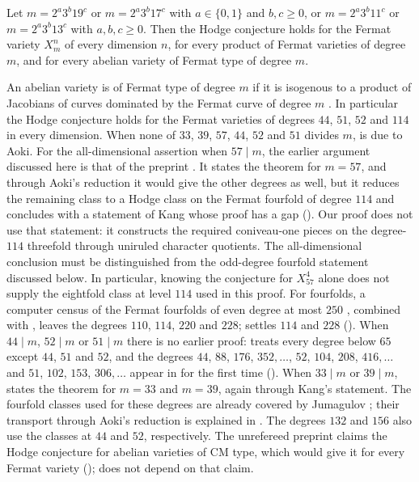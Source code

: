 \begin{maintheorem}\label{thm:fermat114}
Let $m=2^{a}3^{b}19^{c}$ or $m=2^{a}3^{b}17^{c}$ with $a\in\{0,1\}$ and
$b,c\ge0$, or $m=2^{a}3^{b}11^{c}$ or $m=2^{a}3^{b}13^{c}$ with $a,b,c\ge0$.
Then the Hodge conjecture holds for the
Fermat variety $X^{n}_{m}$ of every dimension $n$, for every product of
Fermat varieties of degree $m$, and for every abelian variety of Fermat type
of degree $m$.
\end{maintheorem}

An abelian variety is of Fermat type of degree $m$ if it is isogenous to a
product of Jacobians of curves dominated by the Fermat curve of degree $m$
\cite{Aok00}. In particular the Hodge conjecture holds for the Fermat
varieties of degrees $44$, $51$, $52$ and $114$ in every dimension. When
none of $33$, $39$, $57$, $44$, $52$ and $51$ divides $m$,  is due to
Aoki. For the all-dimensional assertion when $57\mid m$,
the earlier argument discussed here is that of the preprint \cite{MMRV26}. It states the theorem for
$m=57$, and through Aoki's reduction it would give the other degrees as well,
but it reduces the remaining class to a Hodge class on the Fermat fourfold of
degree $114$ and concludes with a statement of Kang \cite{Kan16} whose proof
has a gap (). Our proof does not use that statement: it constructs the required
coniveau-one pieces on the degree-$114$ threefold through uniruled
character quotients. The all-dimensional conclusion must be distinguished
from the odd-degree fourfold statement discussed below. In particular,
knowing the conjecture for $X^4_{57}$ alone does not supply the
eightfold class at level $114$ used in this proof. For fourfolds, a
computer census of the Fermat fourfolds of even degree at most $250$
\cite{Jum26b}, combined with \cite{Pet26}, leaves the degrees $110$, $114$,
$220$ and $228$;  settles $114$ and $228$
(). When $44\mid m$, $52\mid m$ or $51\mid m$ there is no
earlier proof: \cite{MMRV26} treats every degree below $65$ except $44$,
$51$ and $52$, and the degrees $44$, $88$, $176$, $352,\dots$, $52$, $104$,
$208$, $416,\dots$ and $51$, $102$, $153$, $306,\dots$ appear in
 for the first time ().
When $33\mid m$ or $39\mid m$, \cite{MMRV26} states the theorem for $m=33$
and $m=39$, again through Kang's statement. The fourfold classes used
for these degrees are already covered by Jumagulov \cite{Jum26}; their
transport through Aoki's reduction is explained in .
The degrees $132$ and $156$ also use the classes at $44$ and $52$,
respectively. The unrefereed
preprint \cite{OAI26} claims the Hodge
conjecture for abelian varieties of CM type, which would give it for every
Fermat variety ();  does not depend
on that claim.

